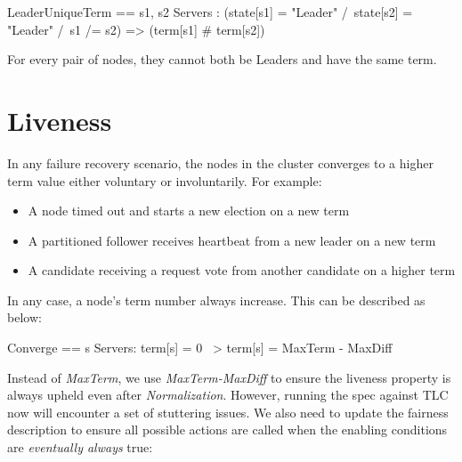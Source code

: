 \documentclass{report}
\begin{document}
\begin{tla}
LeaderUniqueTerm ==
    \A s1, s2 \in Servers :
        (state[s1] = "Leader" /\ state[s2] = "Leader" /\ s1 /= s2) => (term[s1] # term[s2])
\end{tla}
\begin{tlatex}
%
%
\end{tlatex}
\newline

For every pair of nodes, they cannot both be Leaders and have the same
term.

\section{Liveness}

In any failure recovery scenario, the nodes in the cluster converges to a higher
term value either voluntary or involuntarily. For example: 
\begin{itemize}
    \item A node timed out and starts a new election on a new term 
    \item A partitioned follower receives heartbeat from a new leader on a new term
    \item A candidate receiving a request vote from another candidate on a higher term
\end{itemize}

In any case, a node's term number always increase. This can be described as below:\newline
\begin{tla}
Converge ==
    \A s \in Servers:
        term[s] = 0 ~> term[s] = MaxTerm - MaxDiff
\end{tla}
\begin{tlatex}
%
%
\end{tlatex}
\newline

Instead of \textit{MaxTerm}, we use \textit{MaxTerm-MaxDiff} to ensure the
liveness property is always upheld even after \textit{Normalization}. However,
running the spec against TLC now will encounter a set of stuttering issues. We
also need to update the fairness description to ensure all possible actions are
called when the enabling conditions are \textit{eventually always} true:\newline
\end{document}
